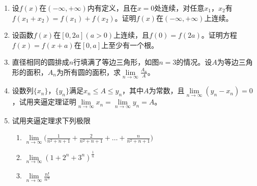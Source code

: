 \begin{enumerate}
    \item 设$f(x)$在$(-\infty,+\infty)$内有定义，且在$x=0$处连续，对任意$x_1$，$x_2$有$f(x_1+x_2)=f(x_1)+f(x_2)$。证明$f(x)$在$(-\infty,+\infty)$上连续。
    \item 设函数$f(x)$在$[0,2a](a>0)$上连续，且$f(0)=f(2a)$。证明方程$f(x)=f(x+a)$在$[0,a]$上至少有一个根。
    \item 直径相同的圆排成$n$行填满了等边三角形，如图$n=3$的情况。设$A$为等边三角形的面积，$A_n$为所有圆的面积，求$\lim\limits_{n\to \infty}\frac{A_n}{A}$。
    \item 设数列$\{x_n\}$，$\{y_n\}$满足$x_n \leq A \leq y_n$，其中$A$为常数，且$\lim\limits_{n \to \infty}(y_n - x_n)=0$，试用夹逼定理证明$\lim\limits_{n \to \infty}x_n=\lim\limits_{n \to \infty}y_n=A$。
    \item 试用夹逼定理求下列极限
        \begin{enumerate}[(1)]
            \item $\lim\limits_{n \to \infty}\big(\frac{1}{n^2+n+1}+\frac{2}{n^2+n+1}+\dots+\frac{n}{n^2+n+1}\big)$
            \item $\lim\limits_{n \to \infty}(1+2^n+3^n)^{\frac{1}{n}}$
            \item $\lim\limits_{n \to \infty}\frac{n!}{n^n}$
        \end{enumerate}
\end{enumerate}
